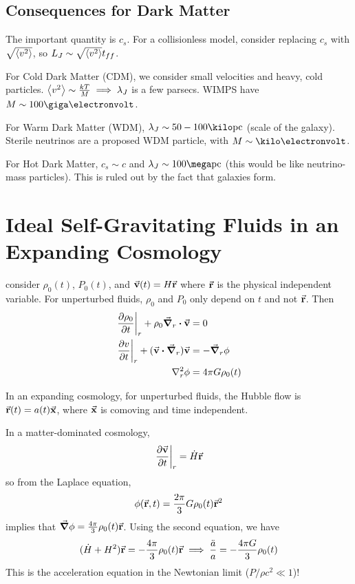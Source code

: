\documentclass[a4paper,twoside,master.tex]{subfiles}
\begin{document}
\subsection{Consequences for Dark Matter}\label{sub:consequences_for_dark_matter}

The important quantity is $ c_s $. For a collisionless model, consider replacing $ c_s $ with $ \sqrt{\ev{v^2}} $, so $ L_J \sim \sqrt{\ev{v^2}} t_{ff} $.

For Cold Dark Matter (CDM), we consider small velocities and heavy, cold particles. $ \ev{v^2} \sim \frac{k T}{M} \implies \lambda_J $ is a few parsecs. WIMPS have $ M \sim 100 \giga\electronvolt $.

For Warm Dark Matter (WDM), $ \lambda_J \sim 50-100 \kilo\text{pc} $ (scale of the galaxy). Sterile neutrinos are a proposed WDM particle, with $ M \sim \kilo \electronvolt $.

For Hot Dark Matter, $ c_s \sim c $ and $ \lambda_J \sim 100\mega\text{pc} $ (this would be like neutrino-mass particles). This is ruled out by the fact that galaxies form.

\section{Ideal Self-Gravitating Fluids in an Expanding Cosmology}\label{sec:ideal_self-gravitating_fluids_in_an_expanding_cosmology}

consider $ \rho_0(t) $, $ P_0(t) $, and $ \va{v}(t) = H \va{r} $ where $ \va{r} $ is the physical independent variable. For unperturbed fluids, $ \rho_0 $ and $ P_0 $ only depend on $ t $ and not $ \va{r} $. Then
\begin{align}
    \eval{\pdv{\rho_0}{t}}_{r} + \rho_0 \grad_r\vdot\va{v} &= 0 \\
    \eval{\pdv{v}{t}}_{r} + (\va{v} \vdot \grad_r) \va{v} &= - \grad_r{\phi} \\
    \laplacian_r{\phi} &= 4 \pi G \rho_0(t)
\end{align}

In an expanding cosmology, for unperturbed fluids, the Hubble flow is $ \va{r}(t) = a(t) \va{x} $, where $ \va{x} $ is comoving and time independent.

In a matter-dominated cosmology,
\begin{equation}
    \eval{\pdv{\va{v}}{t}}_{r} = \dot{H} \va{r}
\end{equation}
so from the Laplace equation,
\begin{equation}
    \phi(\va{r}, t) = \frac{2 \pi}{3} G \rho_0(t) \va{r}^2
\end{equation}
implies that $ \grad{\phi} = \frac{4 \pi}{3} \rho_0(t) \va{r} $. Using the second equation, we have
\begin{equation}
    (\dot{H} + H^2) \va{r} = - \frac{4 \pi}{3} \rho_0(t) \va{r} \implies \frac{\ddot{a}}{a} = - \frac{4 \pi G}{3} \rho_0(t)
\end{equation}
This is the acceleration equation in the Newtonian limit ($ P/\rho c^2 \ll 1 $)!
\end{document}
